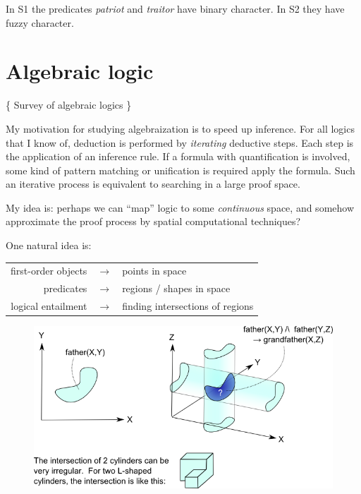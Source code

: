 In S1 the predicates \textit{patriot} and \textit{traitor} have binary character.  In S2 they have fuzzy character.

\underconst

\section{Algebraic logic}

\{ Survey of algebraic logics \}

My motivation for studying algebraization is to speed up inference.  For all logics that I know of, deduction is performed by \textit{iterating} deductive steps.  Each step is the application of an inference rule.  If a formula with quantification is involved, some kind of pattern matching or unification is required apply the formula.  Such an iterative process is equivalent to searching in a large proof space.

My idea is:  perhaps we can ``map'' logic to some \textit{continuous} space, and somehow approximate the proof process by spatial computational techniques?

One natural idea is:

\tab \begin{tabular}{rll}
first-order objects & $\longrightarrow$ & points in space\\
predicates          & $\longrightarrow$ & regions / shapes in space\\
logical entailment  & $\longrightarrow$ & finding intersections of regions\\
\end{tabular}

\begin{figure}[H]
\centering
\includegraphics[scale=1.0]{cylindrical-logic.png}
\end{figure}

